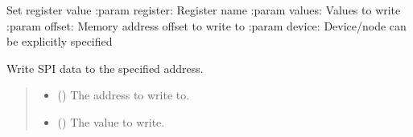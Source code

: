 \documentclass[letterpaper,10pt,english]{sphinxmanual}
\begin{document}
\begin{fulllineitems}
\begin{fulllineitems}
\label{\detokenize{apidocs:management.MANAGEMENT.write_register}}
\pysigstartsignatures
{}
\pysigstopsignatures
\sphinxAtStartPar
Set register value
:param register: Register name
:param values: Values to write
:param offset: Memory address offset to write to
:param device: Device/node can be explicitly specified

\end{fulllineitems}


\begin{fulllineitems}
\label{\detokenize{apidocs:management.MANAGEMENT.write_spi}}
\pysigstartsignatures
{}
\pysigstopsignatures
\sphinxAtStartPar
Write SPI data to the specified address.
\begin{quote}\begin{description}
\begin{itemize}
\item {} 
\sphinxAtStartPar
{} () \textendash{} The address to write to.

\item {} 
\sphinxAtStartPar
{} () \textendash{} The value to write.

\end{itemize}

\end{description}\end{quote}

\end{fulllineitems}


\end{fulllineitems}

\end{document}
